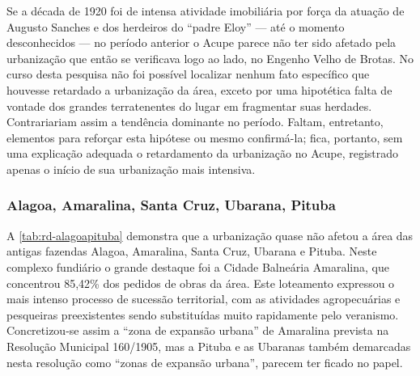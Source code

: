 



Se a década de 1920 foi de intensa atividade imobiliária por força da atuação de Augusto Sanches e dos herdeiros do ``padre Eloy'' --- até o momento desconhecidos --- no período anterior o Acupe parece não ter sido afetado pela urbanização que então se verificava logo ao lado, no Engenho Velho de Brotas. No curso desta pesquisa não foi possível localizar nenhum fato específico que houvesse retardado a urbanização da área, exceto por uma hipotética falta de vontade dos grandes terratenentes do lugar em fragmentar suas herdades. Contrariariam assim a tendência dominante no período. Faltam, entretanto, elementos para reforçar esta hipótese ou mesmo confirmá-la; fica, portanto, sem uma explicação adequada o retardamento da urbanização no Acupe, registrado apenas o início de sua urbanização mais intensiva.

\subsubsection{Alagoa, Amaralina, Santa Cruz, Ubarana, Pituba}\label{subsec:alaamascup}


A \autoref{tab:rd-alagoapituba} demonstra que a urbanização quase não afetou a área das antigas fazendas Alagoa, Amaralina, Santa Cruz, Ubarana e Pituba. Neste complexo fundiário o grande destaque foi a Cidade Balneária Amaralina, que concentrou 85,42\% dos pedidos de obras da área. Este loteamento expressou o mais intenso processo de sucessão territorial, com as atividades agropecuárias e pesqueiras preexistentes sendo substituídas muito rapidamente pelo veranismo. Concretizou-se assim a ``zona de expansão urbana'' de Amaralina prevista na Resolução Municipal 160/1905, mas a Pituba e as Ubaranas também demarcadas nesta resolução como ``zonas de expansão urbana'', parecem ter ficado no papel.

